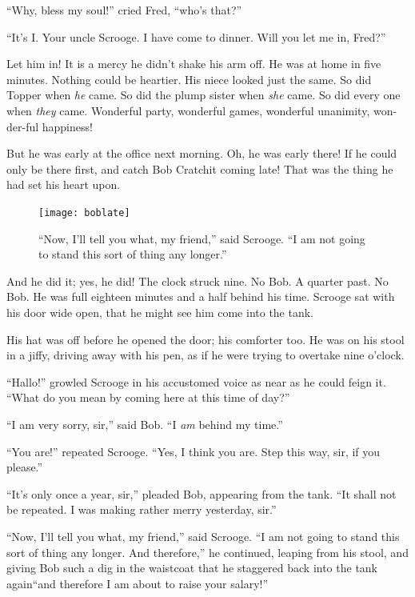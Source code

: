 \documentclass[paper=5.5in:8.5in,BCOR=5mm,twoside,DIV=calc,12pt,usegeometry]{scrbook} %
\begin{document}
\enquote{Why, bless my soul!} cried Fred, \enquote{who's that?}



\enquote{It's I. Your uncle Scrooge. I have come to dinner. Will you let me in, Fred?}

Let him in! It is a mercy he didn't shake his arm off. He was at home in five minutes. Nothing could be heartier. His niece looked just the same. So did Topper when \textit{he} came. So did the plump sister when \textit{she} came. So did every one when \textit{they} came. Wonderful party, wonderful games, wonderful unanimity, won-der-ful happiness!

But he was early at the office next morning. Oh, he was early there! If he could only be there first, and catch Bob Cratchit coming late! That was the thing he had set his heart upon.

\begin{figure}[p]
\begin{minipage}[c]{\linewidth}
\texttt{[image: boblate]}
\caption*{\enquote{Now, I'll tell you what, my friend,} said Scrooge. \enquote{I am not going to stand this sort of thing any longer.}}
\end{minipage}
\end{figure}

And he did it; yes, he did! The clock struck nine. No Bob. A quarter past. No Bob. He was full eighteen minutes and a half behind his time. Scrooge sat with his door wide open, that he might see him come into the tank.

His hat was off before he opened the door; his comforter too. He was on his stool in a jiffy, driving away with his pen, as if he were trying to overtake nine o'clock.

\enquote{Hallo!} growled Scrooge in his accustomed voice as near as he could feign it. \enquote{What do you mean by coming here at this time of day?}

\enquote{I am very sorry, sir,} said Bob. \enquote{I \textit{am} behind my time.}

\enquote{You are!} repeated Scrooge. \enquote{Yes, I think you are. Step this way, sir, if you please.}

\enquote{It's only once a year, sir,} pleaded Bob, appearing from the tank. \enquote{It shall not be repeated. I was making rather merry yesterday, sir.}

\enquote{Now, I'll tell you what, my friend,} said Scrooge. \enquote{I am not going to stand this sort of thing any longer. And therefore,} he continued, leaping from his stool, and giving Bob such a dig in the waistcoat that he staggered back into the tank again\textemdash \enquote{and therefore I am about to raise your salary!}
\end{document}
